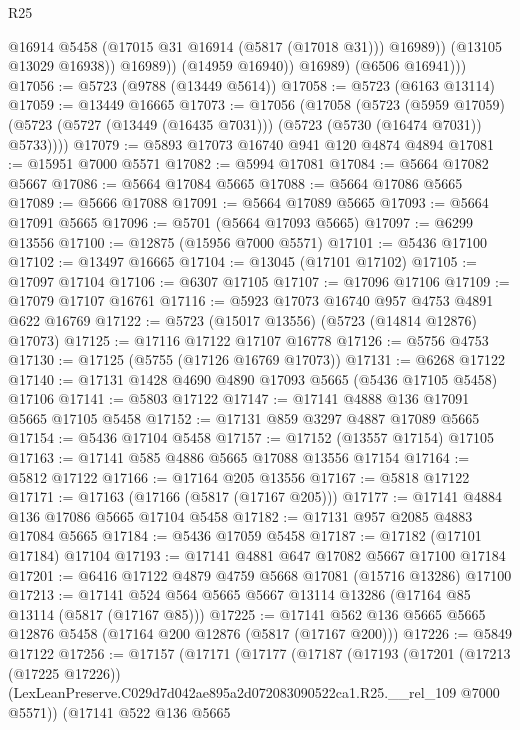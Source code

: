 \begin{lexlean}{R25}
\begin{coremodule}
                      @16914
                      @5458
                      (@17015 @31 @16914 (@5817 (@17018 @31)))
                      @16989))
                  (@13105 @13029 @16938))
                @16989))
            (@14959 @16940))
          @16989)
        (@6506 @16941)))
@17056 := @5723 (@9788 (@13449 @5614))
@17058 := @5723 (@6163 @13114)
@17059 := @13449 @16665
@17073 := @17056
    (@17058
      (@5723
        (@5959 @17059)
        (@5723 (@5727 (@13449 (@16435 @7031))) (@5723 (@5730 (@16474 @7031)) @5733))))
@17079 := @5893 @17073 @16740 @941 @120 @4874 @4894
@17081 := @15951 @7000 @5571
@17082 := @5994 @17081
@17084 := @5664 @17082 @5667
@17086 := @5664 @17084 @5665
@17088 := @5664 @17086 @5665
@17089 := @5666 @17088
@17091 := @5664 @17089 @5665
@17093 := @5664 @17091 @5665
@17096 := @5701 (@5664 @17093 @5665)
@17097 := @6299 @13556
@17100 := @12875 (@15956 @7000 @5571)
@17101 := @5436 @17100
@17102 := @13497 @16665
@17104 := @13045 (@17101 @17102)
@17105 := @17097 @17104
@17106 := @6307 @17105
@17107 := @17096 @17106
@17109 := @17079 @17107 @16761
@17116 := @5923 @17073 @16740 @957 @4753 @4891 @622 @16769
@17122 := @5723 (@15017 @13556) (@5723 (@14814 @12876) @17073)
@17125 := @17116 @17122 @17107 @16778
@17126 := @5756 @4753
@17130 := @17125 (@5755 (@17126 @16769 @17073))
@17131 := @6268 @17122
@17140 := @17131 @1428 @4690 @4890 @17093 @5665 (@5436 @17105 @5458) @17106
@17141 := @5803 @17122
@17147 := @17141 @4888 @136 @17091 @5665 @17105 @5458
@17152 := @17131 @859 @3297 @4887 @17089 @5665
@17154 := @5436 @17104 @5458
@17157 := @17152 (@13557 @17154) @17105
@17163 := @17141 @585 @4886 @5665 @17088 @13556 @17154
@17164 := @5812 @17122
@17166 := @17164 @205 @13556
@17167 := @5818 @17122
@17171 := @17163 (@17166 (@5817 (@17167 @205)))
@17177 := @17141 @4884 @136 @17086 @5665 @17104 @5458
@17182 := @17131 @957 @2085 @4883 @17084 @5665
@17184 := @5436 @17059 @5458
@17187 := @17182 (@17101 @17184) @17104
@17193 := @17141 @4881 @647 @17082 @5667 @17100 @17184
@17201 := @6416 @17122 @4879 @4759 @5668 @17081 (@15716 @13286) @17100
@17213 := @17141 @524 @564 @5665 @5667 @13114 @13286 (@17164 @85 @13114 (@5817 (@17167 @85)))
@17225 := @17141 @562 @136 @5665 @5665 @12876 @5458 (@17164 @200 @12876 (@5817 (@17167 @200)))
@17226 := @5849 @17122
@17256 := @17157
    (@17171
      (@17177
        (@17187
          (@17193
            (@17201
              (@17213 (@17225 @17226))
              (LexLeanPreserve.C029d7d042ae895a2d072083090522ca1.R25.__rel_109 @7000 @5571))
            (@17141
              @522
              @136
              @5665

\end{coremodule}
\end{lexlean}
